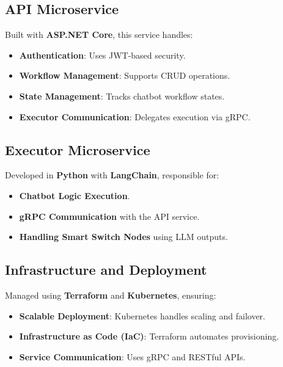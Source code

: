 \subsection{API Microservice}
Built with \textbf{ASP.NET Core}, this service handles:
\begin{itemize}
\item \textbf{Authentication}: Uses JWT-based security.
\item \textbf{Workflow Management}: Supports CRUD operations.
\item \textbf{State Management}: Tracks chatbot workflow states.
\item \textbf{Executor Communication}: Delegates execution via gRPC.
\end{itemize}



\subsection{Executor Microservice}
Developed in \textbf{Python} with \textbf{LangChain}, responsible for:
\begin{itemize}
\item \textbf{Chatbot Logic Execution}.
\item \textbf{gRPC Communication} with the API service.
\item \textbf{Handling Smart Switch Nodes} using LLM outputs.
\end{itemize}

\subsection{Infrastructure and Deployment}
Managed using \textbf{Terraform} and \textbf{Kubernetes}, ensuring:
\begin{itemize}
\item \textbf{Scalable Deployment}: Kubernetes handles scaling and failover.
\item \textbf{Infrastructure as Code (IaC)}: Terraform automates provisioning.
\item \textbf{Service Communication}: Uses gRPC and RESTful APIs.
\end{itemize}